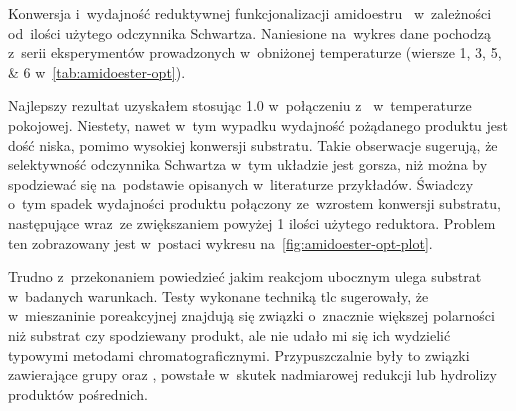\begin{marginfigure}
  \caption{
    Konwersja i~wydajność reduktywnej funkcjonalizacji amidoestru~
      w~zależności od~ilości użytego odczynnika Schwartza.
    Naniesione na~wykres dane pochodzą z~serii eksperymentów prowadzonych w~obniżonej temperaturze
      (wiersze \numlist{1; 3; 5; 6} w~\cref{tab:amidoester-opt}).
  }
  \label{fig:amidoester-opt-plot}
\end{marginfigure}
Najlepszy rezultat uzyskałem stosując \SI{1.0}{\equiv} \schwartz{} w~połączeniu
  z~ w~temperaturze pokojowej.
Niestety, nawet w~tym wypadku wydajność pożądanego produktu jest dość niska,
  pomimo wysokiej konwersji substratu.
Takie obserwacje sugerują, że selektywność odczynnika Schwartza w~tym układzie
  jest gorsza, niż można by spodziewać się na~podstawie opisanych w~literaturze przykładów.
Świadczy o~tym spadek wydajności produktu połączony ze~wzrostem konwersji substratu,
  następujące wraz~ze zwiększaniem powyżej \SI{1}{\equiv} ilości użytego reduktora.
Problem ten zobrazowany jest w~postaci wykresu na~\cref{fig:amidoester-opt-plot}.

Trudno z~przekonaniem powiedzieć jakim reakcjom ubocznym ulega substrat w~badanych warunkach.
Testy wykonane techniką \gls{tlc} sugerowały, że w~mieszaninie poreakcyjnej znajdują się
  związki o~znacznie większej polarności niż substrat czy spodziewany produkt,
  ale nie udało mi się ich wydzielić typowymi metodami chromatograficznymi.
Przypuszczalnie były to związki zawierające grupy  oraz ,
  powstałe w~skutek nadmiarowej redukcji lub hydrolizy produktów pośrednich.

